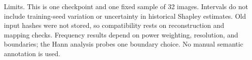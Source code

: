 \documentclass[10pt,a4paper]{article}
\begin{document}
Limits. This is one checkpoint and one fixed sample of 32 images. Intervals do not include training-seed variation or uncertainty in historical Shapley estimates. Old input hashes were not stored, so compatibility rests on reconstruction and mapping checks. Frequency results depend on power weighting, resolution, and boundaries; the Hann analysis probes one boundary choice. No manual semantic annotation is used.
\end{document}
